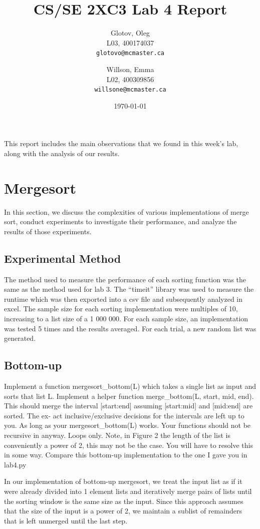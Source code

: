 \documentclass[12pt]{article}
\title{CS/SE 2XC3 Lab 4 Report}
\author{
  Glotov, Oleg\\ L03, 400174037\\
  \texttt{glotovo@mcmaster.ca}
  \and
  Willson, Emma\\ L02, 400309856\\
  \texttt{willsone@mcmaster.ca}
  }
\date{\today}
\begin{document}
\maketitle

This report includes the main observations that we found in this week's lab, along with the analysis of our results.

\newpage 
\section{Mergesort}
In this section, we discuss the complexities of various implementations of merge sort, conduct experiments to investigate their performance, and analyze the results of those experiments.
\subsection{Experimental Method}
The method used to measure the performance of each sorting function was the same as the method used for lab 3. The “timeit” library was used to measure the runtime which was then exported into a csv file and subsequently analyzed in excel. The sample size for each sorting implementation were multiples of 10, increasing to a list size of a 1 000 000. For each sample size, an implementation was tested 5 times and the results averaged. For each trial, a new random list was generated. 

\subsection{Bottom-up}
Implement a function mergesort_bottom(L) which takes a single list as input and sorts
that list L. Implement a helper function merge_bottom(L, start, mid, end). This should merge
the interval [start:end] assuming [start:mid] and [mid:end] are sorted. The ex-
act inclusive/exclusive decisions for the intervals are left up to you. As long as your
mergesort_bottom(L) works. Your functions should not be recursive in anyway. Loops only. Note, in Figure 2 the length of the list is conveniently a power of 2, this may not be the
case. You will have to resolve this in some way. Compare this bottom-up implementation to the one I gave you in lab4.py

In our implementation of bottom-up mergesort, we treat the input list as if it were already divided into 1 element lists and iteratively merge pairs of lists until the sorting window is the same size as the input. Since this approach assumes that the size of the input is a power of 2, we maintain a sublist of remainders that is left unmerged until the last step. 
\end{document}
